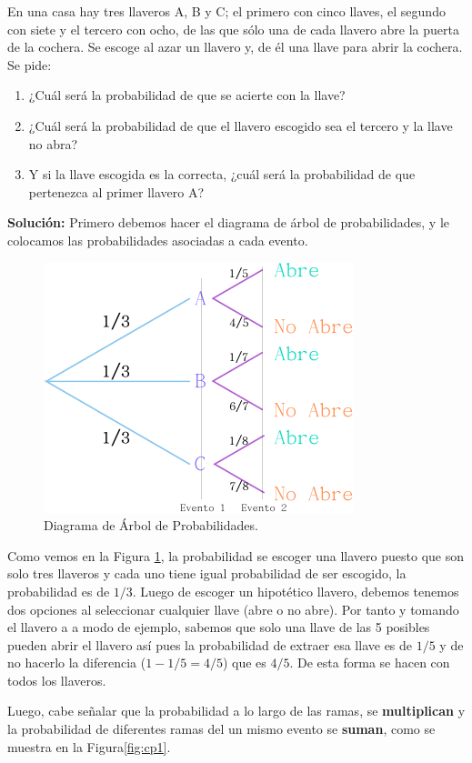 \documentclass[11pt,letterpaper]{report}
\begin{document}
      En una casa hay tres llaveros A, B y C; el primero con cinco llaves, el segundo con siete y el tercero con ocho, de las que sólo una de cada llavero abre la puerta de la cochera. Se escoge al azar un llavero y, de él una llave para abrir la cochera. Se pide:
      \begin{enumerate}
          \item ¿Cuál será la probabilidad de que se acierte con la llave?
          \item ¿Cuál será la probabilidad de que el llavero escogido sea el tercero y la llave no abra?
          \item Y si la llave escogida es la correcta, ¿cuál será la probabilidad de que pertenezca al primer llavero A?
      \end{enumerate}
      \textbf{Solución:}
      Primero debemos hacer el diagrama de árbol de probabilidades, y le colocamos las probabilidades asociadas a cada evento.

      \begin{figure}[!h]
          \centering
          \includegraphics[width=0.5\linewidth]{images/cp2}
          \caption{Diagrama de Árbol de Probabilidades.}
          \label{fig:cp2}
      \end{figure}

      Como vemos en la Figura \ref{fig:cp2}, la probabilidad se escoger una llavero puesto que son solo tres llaveros y cada uno tiene igual probabilidad de ser escogido, la probabilidad es de $1/3$. Luego de escoger un hipotético llavero, debemos tenemos dos opciones al seleccionar cualquier llave (abre o no abre). Por tanto y tomando el llavero a a modo de ejemplo, sabemos que solo una llave de las 5 posibles pueden abrir el llavero as\'i pues la probabilidad de extraer esa llave es de $1/5$ y de no hacerlo la diferencia ($1-1/5=4/5$) que es $4/5$. De esta forma se hacen con todos los llaveros.

      Luego, cabe señalar que la probabilidad a lo largo de las ramas, se \textbf{multiplican} y la probabilidad de diferentes ramas del un mismo evento se \textbf{suman}, como se muestra en la Figura\ref{fig:cp1}.
\end{document}
